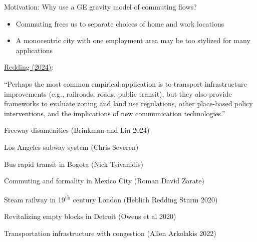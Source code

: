 \documentclass[11pt,notes=hide,aspectratio=169]{beamer}
\begin{document}
\begin{frame}{Motivation: Why use a GE gravity model of commuting flows?}
\begin{itemize}
\item Commuting frees us to separate choices of home and work locations
\item A monocentric city with one employment area may be too stylized for many applications
\end{itemize}
{\small\href{https://www.nber.org/papers/w33130}{Redding (2024)}:
{``Perhaps the most common empirical application is to transport infrastructure improvements (e.g., railroads, roads, public transit), but they also provide frameworks to evaluate zoning and land use regulations, other place-based policy interventions, and the implications of new communication technologies.''\par}}
\begin{itemize}{\small
\item Freeway disamenities (Brinkman and Lin 2024)
\item Los Angeles subway system (Chris Severen)
\item Bus rapid transit in Bogota (Nick Tsivanidis)
\item Commuting and formality in Mexico City (Roman David Zarate)
\item Steam railway in 19\textsuperscript{th} century London (Heblich Redding Sturm 2020)
\item Revitalizing empty blocks in Detroit (Owens et al 2020)
\item Transportation infrastructure with congestion (Allen Arkolakis 2022)
}\end{itemize}
\end{frame}
\end{document}
